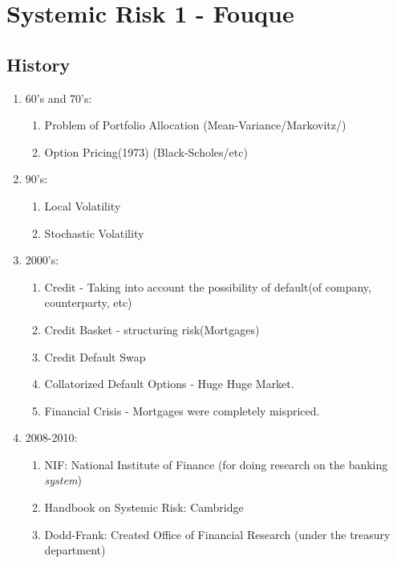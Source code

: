 \chapter{Systemic Risk 1 - Fouque}
\section{History}
\begin{enumerate}
	\item 60's and 70's: 
	\begin{enumerate}
		\item Problem of Portfolio Allocation (Mean-Variance/Markovitz/)
		\item Option Pricing(1973) (Black-Scholes/etc)
	\end{enumerate}
	\item 90's:
	\begin{enumerate}
		\item Local Volatility
		\item Stochastic Volatility
	\end{enumerate}
	\item 2000's:
	\begin{enumerate}
		\item Credit - Taking into account the possibility of default(of company, counterparty, etc)
		\item Credit Basket - structuring risk(Mortgages)
		\item Credit Default Swap
		\item Collatorized Default Options - Huge Huge Market.
		\item Financial Crisis - Mortgages were completely mispriced.
	\end{enumerate}
	
	\item 2008-2010:
	\begin{enumerate}
		\item NIF: National Institute of Finance (for doing research on the banking \emph{system})
		\item Handbook on Systemic Risk: Cambridge
		\item Dodd-Frank: Created Office of Financial Research (under the treasury department)
	\end{enumerate}
\end{enumerate}


